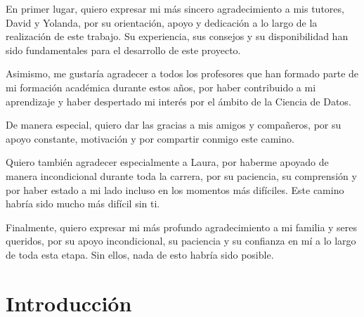 \documentclass[twoside,spanish,a4paper,12pt]{tfg}
\begin{document}
\begin{agradecimientos}

En primer lugar, quiero expresar mi más sincero agradecimiento a mis tutores, David y Yolanda, por su orientación, apoyo y dedicación a lo largo de la realización de este trabajo. Su experiencia, sus consejos y su disponibilidad han sido fundamentales para el desarrollo de este proyecto.

\vspace{0.5em}

Asimismo, me gustaría agradecer a todos los profesores que han formado parte de mi formación académica durante estos años, por haber contribuido a mi aprendizaje y haber despertado mi interés por el ámbito de la Ciencia de Datos.

\vspace{0.5em}

De manera especial, quiero dar las gracias a mis amigos y compañeros, por su apoyo constante, motivación y por compartir conmigo este camino.

\vspace{0.5em}

Quiero también agradecer especialmente a Laura, por haberme apoyado de manera incondicional durante toda la carrera, por su paciencia, su comprensión y por haber estado a mi lado incluso en los momentos más difíciles. Este camino habría sido mucho más difícil sin ti.

\vspace{0.5em}

Finalmente, quiero expresar mi más profundo agradecimiento a mi familia y seres queridos, por su apoyo incondicional, su paciencia y su confianza en mí a lo largo de toda esta etapa. Sin ellos, nada de esto habría sido posible.

\end{agradecimientos}
\cleardoublepage

\tableofcontents

\pagestyle{tfg}
\justify



\chapter{Introducción}

\end{document}
